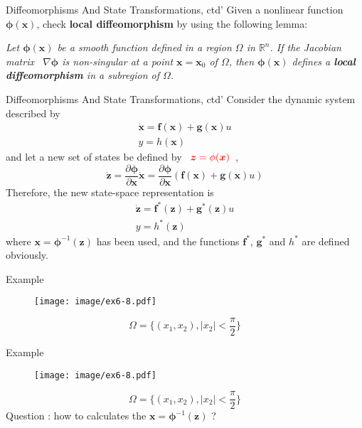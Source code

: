 \documentclass{beamer}
\renewcommand{\vec}[1]{\ensuremath{\boldsymbol{#1}}} %
\begin{document}
\begin{frame}{Diffeomorphisms And State Transformations, ctd'}
    Given a nonlinear function $\vec{\phi} (\vec{x})$, check \textbf{local diffeomorphism} by using the following lemma:
    \begin{lemma}[6.2]
    \textit{
        Let $\vec{\phi} (\vec{x})$ be a smooth function defined in a region $\Omega$ in $\mathbb{R}^{n}$. If the {\color{red}Jacobian matrix ~$\nabla \vec{\phi}$} is {\color{red}non-singular} at a point $\vec{x}=\vec{x}_{0}$ of $\Omega$, then $\vec{\phi}(\vec{x})$ defines a \textbf{local diffeomorphism} in a subregion of $\Omega$.
        }
    \end{lemma}
\end{frame}


\begin{frame}{Diffeomorphisms And State Transformations, ctd'}
Consider the dynamic system described by
    $$
    \begin{array}{l}{\dot{\vec{x}}=\vec{f}(\vec{x})+\vec{g}(\vec{x}) u} \\ {y=h(\vec{x})}\end{array}
    $$
    and let a new set of states be defined by ~${\color{red}\vec{z}=\phi(\vec{x})}$~,
    $$
    \dot{\mathbf{z}}=\frac{\partial \vec{\phi}}{\partial \mathbf{x}} \dot{\mathbf{x}}=\frac{\partial \vec{\phi}}{\partial \mathbf{x}}(\mathbf{f}(\mathbf{x})+\mathbf{g}(\mathbf{x}) u)
    $$
    Therefore, the new state-space representation is
    $$
    \begin{array}{l}{\dot{\vec{z}}=\vec{f}^{*}(\vec{z})+\vec{g}^{*}(\vec{z})u} \\ {y=h^{*}(\vec{z})}\end{array}
    $$
    where $\vec{x}=\vec{\phi}^{-1}(\vec{z})$ has been used, and the functions $\vec{f}^{*}$, $\vec{g}^{*}$ and $h^{*}$ are defined obviously.
\end{frame}


\begin{frame}{Example}
    \begin{figure}
      \centering
      \texttt{[image: image/ex6-8.pdf]}
    \end{figure}
    \vspace{-10pt}
    $$
    \Omega = \{ (x_{1}, x_{2}), |x_{2}| < \frac{\pi}{2} \}
    $$
\end{frame}
\begin{frame}{Example}
    \begin{figure}
      \centering
      \texttt{[image: image/ex6-8.pdf]}
    \end{figure}
    \vspace{-10pt}
    $$
    \Omega = \{ (x_{1}, x_{2}), |x_{2}| < \frac{\pi}{2} \}
    $$
    {\color{red}\large Question : how to calculates the $\vec{x}=\vec{\phi}^{-1}(\vec{z})$ ?}
\end{frame}
\end{document}
